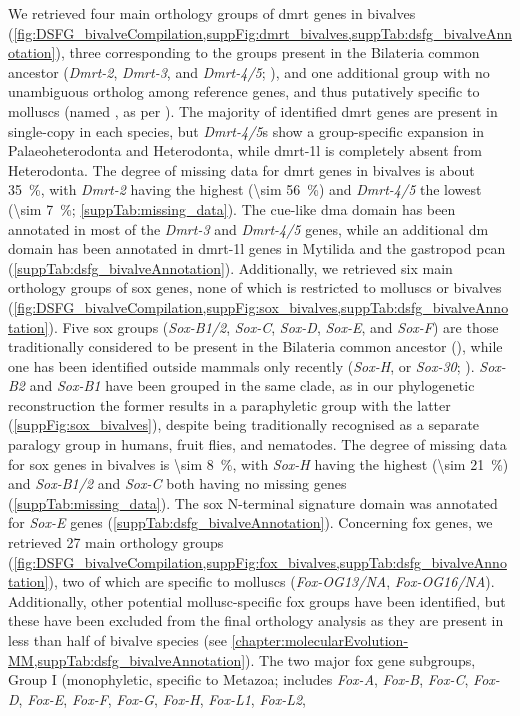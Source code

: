 We retrieved four main orthology groups of \gls{dmrt} genes in bivalves (\cref{fig:DSFG_bivalveCompilation,suppFig:dmrt_bivalves,suppTab:dsfg_bivalveAnnotation}), three corresponding to the groups present in the Bilateria common ancestor (\textit{Dmrt-2}, \textit{Dmrt-3}, and \textit{Dmrt-4/5}; ), and one additional group with no unambiguous ortholog among reference genes, and thus putatively specific to molluscs (named , as per ). The majority of identified \gls{dmrt} genes are present in single-copy in each species, but \textit{Dmrt-4/5}s show a group-specific expansion in Palaeoheterodonta and Heterodonta, while \gls{dmrt-1l} is completely absent from Heterodonta. The degree of missing data for \gls{dmrt} genes in bivalves is about \qty{35}{\percent}, with \textit{Dmrt-2} having the highest (\qty{\sim 56}{\percent}) and \textit{Dmrt-4/5} the lowest (\qty{\sim 7}{\percent}; \cref{suppTab:missing_data}). The \gls{cue}-like \gls{dma} domain has been annotated in most of the \textit{Dmrt-3} and \textit{Dmrt-4/5} genes, while an additional \gls{dm} domain has been annotated in \gls{dmrt-1l} genes in Mytilida and the gastropod \gls{pcan} (\cref{suppTab:dsfg_bivalveAnnotation}). Additionally, we retrieved six main orthology groups of \gls{sox} genes, none of which is restricted to molluscs or bivalves (\cref{fig:DSFG_bivalveCompilation,suppFig:sox_bivalves,suppTab:dsfg_bivalveAnnotation}). Five \gls{sox} groups (\textit{Sox-B1/2}, \textit{Sox-C}, \textit{Sox-D}, \textit{Sox-E}, and \textit{Sox-F}) are those traditionally considered to be present in the Bilateria common ancestor (), while one has been identified outside mammals only recently (\textit{Sox-H}, or \textit{Sox-30}; ). \textit{Sox-B2} and \textit{Sox-B1} have been grouped in the same clade, as in our phylogenetic reconstruction the former results in a paraphyletic group with the latter (\cref{suppFig:sox_bivalves}), despite being traditionally recognised as a separate paralogy group in humans, fruit flies, and nematodes. The degree of missing data for \gls{sox} genes in bivalves is \qty{\sim 8}{\percent}, with \textit{Sox-H} having the highest (\qty{\sim 21}{\percent}) and \textit{Sox-B1/2} and \textit{Sox-C} both having no missing genes (\cref{suppTab:missing_data}). The \gls{sox} N-terminal signature domain was annotated for \textit{Sox-E} genes (\cref{suppTab:dsfg_bivalveAnnotation}). Concerning \gls{fox} genes, we retrieved 27 main orthology groups (\cref{fig:DSFG_bivalveCompilation,suppFig:fox_bivalves,suppTab:dsfg_bivalveAnnotation}), two of which are specific to molluscs (\textit{Fox-OG13/NA}, \textit{Fox-OG16/NA}). Additionally, other potential mollusc-specific \gls{fox} groups have been identified, but these have been excluded from the final orthology analysis as they are present in less than half of bivalve species (see \cref{chapter:molecularEvolution-MM,suppTab:dsfg_bivalveAnnotation}). The two major \gls{fox} gene subgroups, Group I (monophyletic, specific to Metazoa; includes \textit{Fox-A}, \textit{Fox-B}, \textit{Fox-C}, \textit{Fox-D}, \textit{Fox-E}, \textit{Fox-F}, \textit{Fox-G}, \textit{Fox-H}, \textit{Fox-L1}, \textit{Fox-L2}, 